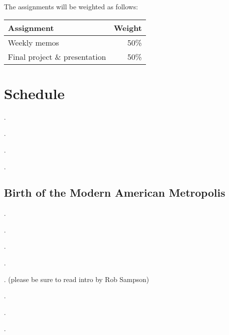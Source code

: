 \documentclass[11pt]{syllabus}
\begin{document}
\noindent The assignments will be weighted as follows:

\begin{center}
\begin{tabular}{lr}
\textbf{Assignment} & \textbf{Weight}\\\toprule
Weekly memos & 50\% \\
Final project \& presentation & 50\% \\\bottomrule
\end{tabular}
\end{center}

\section{Schedule}


\begin{readings}
\item {}.
\item {}.
\item {}.
\item {}.
\end{readings}

\subsection{Birth of the Modern American Metropolis}

\begin{readings}
\item {}.
\item {}.
\item {}.
\item {}.
\end{readings}

\begin{readings}
\item {}. (please be sure to read intro by Rob Sampson)
\item {}.
\item {}.
\item {}.
\end{readings}
\end{document}
